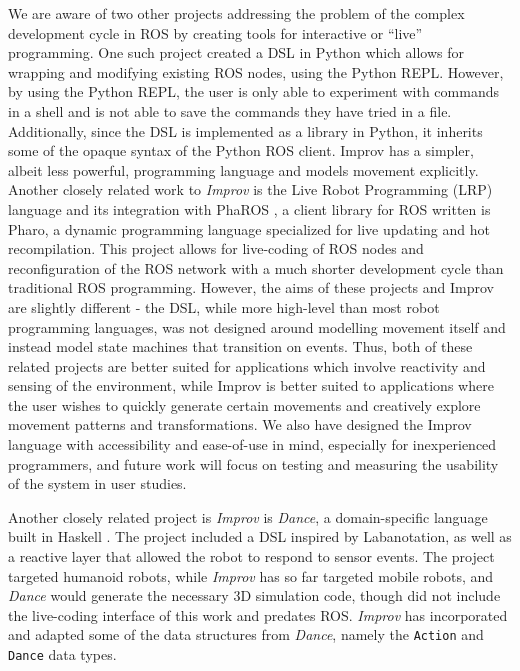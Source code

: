 \documentclass[sigconf]{acmart}
\begin{document}
We are aware of two other projects addressing the problem of the complex
development cycle in ROS by creating tools for interactive or ``live''
programming. One such project \cite{python_live_DSLRob} created a DSL in Python
which allows for wrapping and modifying existing ROS nodes, using the Python
REPL. However, by using the Python REPL, the user is only able to experiment
with commands in a shell and is not able to save the commands they have tried in
a file. Additionally, since the DSL is implemented as a library in Python, it
inherits some of the opaque syntax of the Python ROS client. Improv has a
simpler, albeit less powerful, programming language and models movement
explicitly. Another closely related work to \emph{Improv} is the Live Robot
Programming (LRP) language \cite{campusano2017live} and its integration with PhaROS
\cite{estefo2014towards}, a client library for ROS written is Pharo, a dynamic
programming language specialized for live updating and hot recompilation. This
project allows for live-coding of ROS nodes and reconfiguration of the ROS
network with a much shorter development cycle than traditional ROS programming.
However, the aims of these projects and Improv are slightly different - the DSL,
while more high-level than most robot programming languages, was not designed
around modelling movement itself and instead model state machines that
transition on events. Thus, both of these related projects are better suited for
applications which involve reactivity and sensing of the environment, while
Improv is better suited to applications where the user wishes to quickly
generate certain movements and creatively explore movement patterns and
transformations. We also have designed the Improv language with accessibility
and ease-of-use in mind, especially for inexperienced programmers, and future
work will focus on testing and measuring the usability of the system in user
studies.

Another closely related project is \emph{Improv} is \emph{Dance}, a
domain-specific language built in Haskell \cite{Dance2003}. The project included
a DSL inspired by Labanotation, as well as a reactive layer that allowed
the robot to respond to sensor events. The project targeted humanoid
robots, while \emph{Improv} has so far targeted mobile robots, and
\emph{Dance} would generate the necessary 3D simulation code, though did
not include the live-coding interface of this work and predates ROS.
\emph{Improv} has incorporated and adapted some of the data structures
from \emph{Dance}, namely the \texttt{Action} and \texttt{Dance} data
types.
\end{document}
